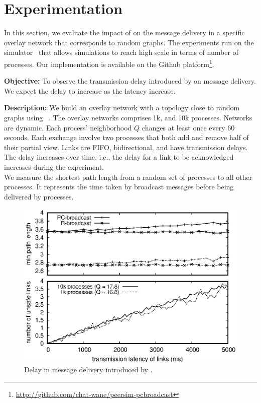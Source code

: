 
\section{Experimentation}
\label{sec:experimentation}


In this section, we evaluate the impact of \CBROADCAST on the message delivery
in a specific overlay network that corresponds to random graphs. The experiments
run on the \PEERSIM simulator~\cite{montresor2009peersim} that allows
simulations to reach high scale in terms of number of processes. Our
implementation is available on the Github
platform\footnote{\url{http://github.com/chat-wane/peersim-pcbroadcast}}.


\noindent \textbf{Objective:} To observe the transmission delay introduced by
\CBROADCAST on message delivery. We expect the delay to increase as the latency
increase.

\noindent \textbf{Description:} We build an overlay network with a topology
close to random graphs using \SPRAY~\cite{nedelec2017adaptive}. The overlay
networks comprises 1k, and 10k processes. Networks are dynamic. Each process'
neighborhood $Q$ changes at least once every 60 seconds. Each exchange involve
two processes that both add and remove half of their partial view.  Links are
FIFO, bidirectional, and have transmission delays. The delay increases over
time, i.e., the delay for
a link to be acknowledged increases during the experiment.\\
We measure the shortest path length from a random set of processes to all other
processes. It represents the time taken by broadcast messages before being
delivered by processes.

\begin{figure}
  \begin{center}
    \includegraphics[width=1.4\columnwidth]{./img/delay.eps}
    \caption{\label{fig:delay}Delay in message delivery introduced by \CBROADCAST.}
  \end{center}
\end{figure}

